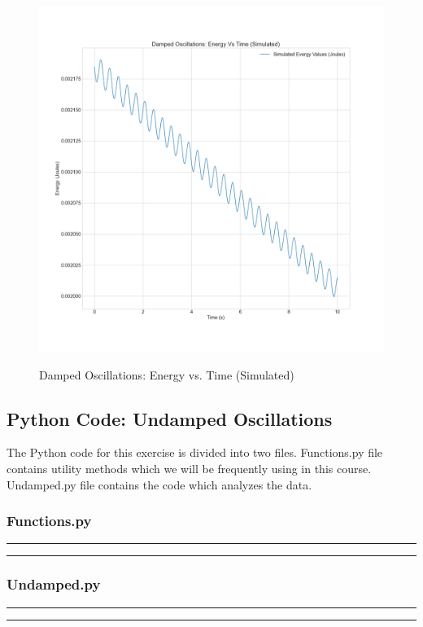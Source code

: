 \documentclass[letterpaper,12pt]{article}
\begin{document}
\begin{figure}[H]
  \centering
  \includegraphics[width=0.95\linewidth]{../Pankaj/lab3_damped_sim_energy_vs_time.png}    
  \begin{center}
    \emph{}
  \end{center}
  \caption{Damped Oscillations: Energy vs. Time (Simulated)}
  \label{damped-sim-e-t-plot}
\end{figure}

\pagebreak

\subsection{Python Code: Undamped Oscillations}

The Python code for this exercise is divided into two files. Functions.py file contains utility methods
which we will be frequently using in this course. Undamped.py file contains the code which analyzes
the data.

\subsubsection{Functions.py}
\noindent\rule{\textwidth}{1pt}

\noindent\rule{\textwidth}{1pt}

\pagebreak

\subsubsection{Undamped.py}
\noindent\rule{\textwidth}{1pt}

\noindent\rule{\textwidth}{1pt}
\end{document}
